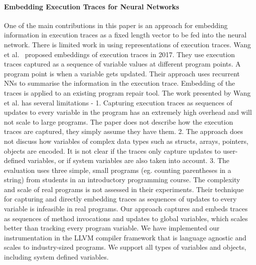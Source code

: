 \paragraph{Embedding Execution Traces for Neural Networks}
One of the main contributions in this paper is an approach for embedding information in execution traces as a fixed length vector to be fed into the neural network. There is limited work in using representations of execution traces. Wang et al.~\cite{wang2017dynamic} proposed embeddings of execution traces in 2017. They use execution traces captured as a sequence of variable values at different program points. A program point is when a variable gets updated. Their approach uses recurrent NNs to summarise the information in the execution trace. Embedding of the traces is applied to an existing program repair tool. The work presented by Wang et al. has several limitations - 1. Capturing execution traces as sequences of updates to every variable in the program has an extremely high overhead and will not scale to large programs. The paper does not describe how the execution traces are captured, they simply assume they have them. 2. The approach does not discuss how variables of complex data types such as structs, arrays, pointers, objects are encoded. It is not clear if the traces only capture updates to user-defined variables, or if system variables are also taken into account. 
3. The evaluation uses three simple, small  programs (eg. counting parentheses in a string) from students in an introductory programming course. %
The complexity and scale of real programs is not assessed in their experiments. Their technique for capturing and directly embedding traces as sequences of updates to every variable is infeasible in real programs. 
Our approach captures and embeds traces as sequences of method invocations and updates to global variables, which scales better than tracking every program variable. We have implemented our instrumentation in the LLVM compiler framework that is language agnostic and scales to industry-sized programs. We support all types of variables and objects, including system defined variables. %
